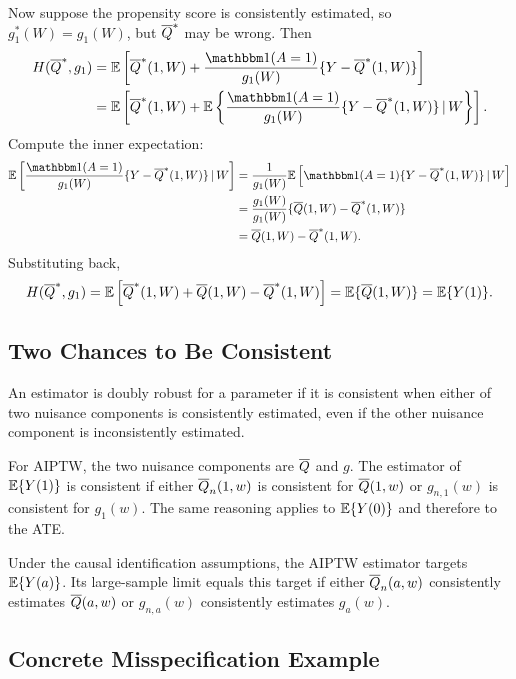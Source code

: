 Now suppose the propensity score is consistently estimated, so
$g_1^*(W)=g_1(W)$, but $\overline{Q}^*$ may be wrong. Then
\[
\begin{aligned}
H(\Qbar^*,g_1)
&=
\E\left[
\Qbar^*(1,W)
+
\frac{\ind(A=1)}{g_1(W)}
\{Y-\Qbar^*(1,W)\}
\right]\\
&=
\E\left[
\Qbar^*(1,W)
+
\E\left\{
\frac{\ind(A=1)}{g_1(W)}
\{Y-\Qbar^*(1,W)\}
\given W
\right\}
\right].
\end{aligned}
\]
Compute the inner expectation:
\[
\begin{aligned}
\E\left[
\frac{\ind(A=1)}{g_1(W)}
\{Y-\Qbar^*(1,W)\}
\given W
\right]
&=
\frac{1}{g_1(W)}
\E\left[
\ind(A=1)\{Y-\Qbar^*(1,W)\}
\given W
\right]\\
&=
\frac{g_1(W)}{g_1(W)}
\{\Qbar(1,W)-\Qbar^*(1,W)\}\\
&=
\Qbar(1,W)-\Qbar^*(1,W).
\end{aligned}
\]
Substituting back,
\[
H(\overline{Q}^*,g_1)
=
\mathbb{E}\left[
\overline{Q}^*(1,W)+\overline{Q}(1,W)-\overline{Q}^*(1,W)
\right]
=
\mathbb{E}\{\overline{Q}(1,W)\}
=
\mathbb{E}\{Y(1)\}.
\]

\subsection{Two Chances to Be Consistent}

\begin{definition}
An estimator is doubly robust for a parameter if it is consistent when either of two
nuisance components is consistently estimated, even if the other nuisance component
is inconsistently estimated.
\end{definition}

For AIPTW, the two nuisance components are $\overline{Q}$ and $g$. The estimator of
$\mathbb{E}\{Y(1)\}$ is consistent if either $\overline{Q}_n(1,w)$ is consistent for $\overline{Q}(1,w)$ or
$g_{n,1}(w)$ is consistent for $g_1(w)$. The same reasoning applies to
$\mathbb{E}\{Y(0)\}$ and therefore to the ATE.

\begin{identificationbox}
Under the causal identification assumptions, the AIPTW estimator targets
$\mathbb{E}\{Y(a)\}$. Its large-sample limit equals this target if either
$\overline{Q}_n(a,w)$ consistently estimates $\overline{Q}(a,w)$ or $g_{n,a}(w)$ consistently
estimates $g_a(w)$.
\end{identificationbox}

\subsection{Concrete Misspecification Example}

